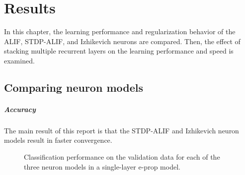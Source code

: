 \chapter{Results}\label{ch:results}
In this chapter, the learning performance and regularization behavior of the ALIF, STDP-ALIF, and Izhikevich neurons are compared.
Then, the effect of stacking multiple recurrent layers on the learning performance and speed is examined.

\section{Comparing neuron models}
	\paragraph{Accuracy}
		The main result of this report is that the STDP-ALIF and Izhikevich neuron models result in faster convergence.

		\begin{figure}[bth]
		    \myfloatalign
		     \quad
		    \caption[Classification performance for each of the three neuron models in a single-layer e-prop model.]{Classification performance on the validation data for each of the three neuron models in a single-layer e-prop model.}\label{fig:sl-acc}
		\end{figure}

